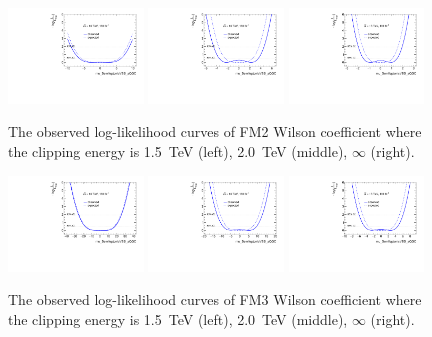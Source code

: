 \begin{figure}[ht]
    \centering
    \includegraphics[width=0.32\textwidth]{figures/aQGC/profileFM21500}
    	\includegraphics[width=0.32\textwidth]{figures/aQGC/profileFM22000}
        \includegraphics[width=0.32\textwidth]{figures/aQGC/profileFM2inf}
        \caption{The observed log-likelihood curves of FM2 Wilson coefficient where the clipping energy is 1.5~TeV (left), 2.0~TeV (middle), $\infty$ (right).}
        \label{fig:ProfileLLFM2}
\end{figure}
\begin{figure}[ht]
    \centering
    \includegraphics[width=0.32\textwidth]{figures/aQGC/profileFM31500}
    	\includegraphics[width=0.32\textwidth]{figures/aQGC/profileFM32000}
        \includegraphics[width=0.32\textwidth]{figures/aQGC/profileFM3inf}
        \caption{The observed log-likelihood curves of FM3 Wilson coefficient where the clipping energy is 1.5~TeV (left), 2.0~TeV (middle), $\infty$ (right).}
        \label{fig:ProfileLLFM3}
\end{figure}

